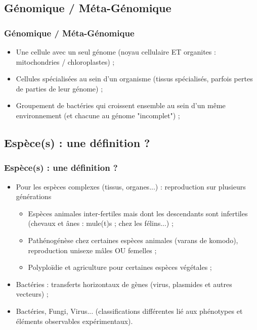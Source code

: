 \documentclass{beamer}
\begin{document}
\subsection{ G{\'e}nomique / M{\'e}ta-G{\'e}nomique }
\begin{frame}
	\frametitle{ G{\'e}nomique / M{\'e}ta-G{\'e}nomique }
	\begin{itemize}
		\item Une cellule avec un seul g{\'e}nome (noyau cellulaire ET organites : mitochondries / chloroplastes) ; 
		\item Cellules sp{\'e}cialis{\'e}es au sein d'un organisme (tissus sp{\'e}cialis{\'e}s, parfois pertes de parties de leur g{\'e}nome) ; 
		\item Groupement de bact{\'e}ries qui croissent ensemble au sein d'un m{\^e}me environnement (et chacune au g{\'e}nome "incomplet") ;
	\end{itemize}
\end{frame}

\subsection{ Esp{\`e}ce(s) : une d{\'e}finition ? }
\begin{frame}
	\frametitle{ Esp{\`e}ce(s) : une d{\'e}finition ? }
	\begin{itemize}
		\item Pour les esp{\`e}ces complexes (tissus, organes...) : reproduction sur plusieurs g{\'e}n{\'e}rations
		\begin{itemize}
			\item Esp{\`e}ces animales inter-fertiles mais dont les descendants sont infertiles (chevaux et {\^a}nes : mule(t)s ; chez les f{\'e}lins...) ;  
			\item Path{\'e}nog{\'e}n{\`e}se chez certaines esp{\`e}ces animales (varans de komodo), reproduction unisexe m{\^a}les OU femelles ; 
			\item Polyplo{\"i}die et agriculture pour certaines esp{\`e}ces v{\'e}g{\'e}tales ; 
		\end{itemize}
		\item Bact{\'e}ries : transferts horizontaux de g{\`e}nes (virus, plasmides et autres vecteurs) ; 
		\item Bact{\'e}ries, Fungi, Virus... (classifications diff{\'e}rentes li{\'e} aux ph{\'e}notypes et {\'e}l{\'e}ments observables exp{\'e}rimentaux). 
	\end{itemize}
\end{frame}
\end{document}
